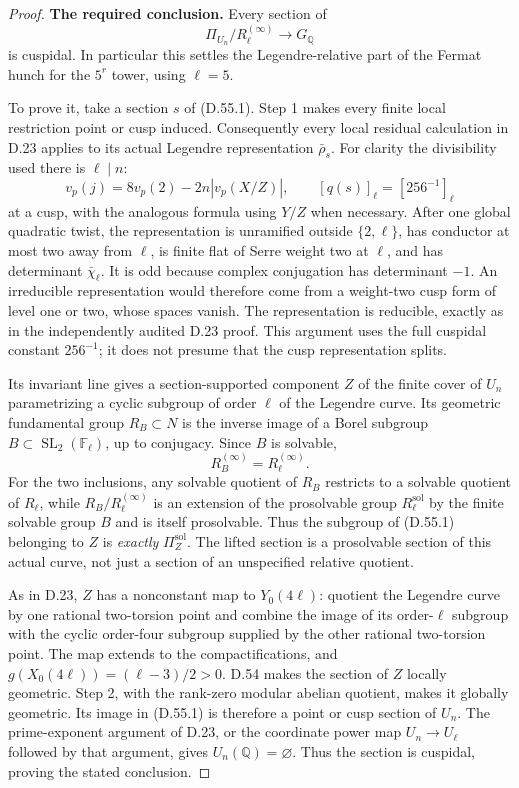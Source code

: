 \begin{proof}
\medskip
\noindent\textbf{The required conclusion.}
Every section of
\[
 \Pi_{U_n}/R_\ell^{(\infty)}\longrightarrow G_{\mathbb Q}
                                                        \tag{D.55.1}
\]
is cuspidal.  In particular this settles the Legendre-relative
part of the Fermat hunch for the $5^r$ tower, using $\ell=5$.

To prove it, take a section $s$ of (D.55.1).  Step 1 makes every
finite local restriction point or cusp induced.  Consequently
every local residual calculation in D.23 applies to its actual
Legendre representation $\bar\rho_s$.  For clarity the divisibility
used there is $\ell\mid n$:
\[
  v_p(j)=8v_p(2)-2n|v_p(X/Z)|,
       \qquad [q(s)]_\ell=[256^{-1}]_\ell
\]
at a cusp, with the analogous formula using $Y/Z$ when necessary.
After one global quadratic twist, the representation is unramified
outside $\{2,\ell\}$, has conductor at most two away from $\ell$,
is finite flat of Serre weight two at $\ell$, and has determinant
$\bar\chi_\ell$.  It is odd because complex conjugation has
determinant $-1$.  An irreducible representation would therefore
come from a weight-two cusp form of level one or two, whose spaces
vanish.  The representation is reducible, exactly as in the
independently audited D.23 proof.  This argument uses the full
cuspidal constant $256^{-1}$; it does not presume that the cusp
representation splits.

Its invariant line gives a section-supported component $Z$ of
the finite cover of $U_n$ parametrizing a cyclic subgroup of order
$\ell$ of the Legendre curve.  Its geometric fundamental group
$R_B\subset N$ is the inverse image of a Borel subgroup
$B\subset\operatorname{SL}_2(\mathbb F_\ell)$, up to conjugacy.
Since $B$ is solvable,
\[
                       R_B^{(\infty)}=R_\ell^{(\infty)}.    \tag{D.55.2}
\]
For the two inclusions, any solvable quotient of $R_B$ restricts
to a solvable quotient of $R_\ell$, while
$R_B/R_\ell^{(\infty)}$ is an extension of the prosolvable group
$R_\ell^{\mathrm{sol}}$ by the finite solvable group $B$ and is
itself prosolvable.  Thus the subgroup of (D.55.1) belonging to $Z$
is \emph{exactly} $\Pi_Z^{\mathrm{sol}}$.  The lifted section is
a prosolvable section of this actual curve, not just a section of
an unspecified relative quotient.

As in D.23, $Z$ has a nonconstant map to $Y_0(4\ell)$: quotient
the Legendre curve by one rational two-torsion point and combine
the image of its order-$\ell$ subgroup with the cyclic order-four
subgroup supplied by the other rational two-torsion point.
The map extends to the compactifications, and
$g(X_0(4\ell))=(\ell-3)/2>0$.  D.54 makes the
section of $Z$ locally geometric.  Step 2, with the rank-zero
modular abelian quotient, makes it globally geometric.  Its image
in (D.55.1) is therefore a point or cusp section of $U_n$.
The prime-exponent argument of D.23, or the coordinate power map
$U_n\to U_\ell$ followed by that argument, gives $U_n(\mathbb Q)=
\varnothing$.  Thus the section is cuspidal, proving the stated
conclusion.


\end{proof}
